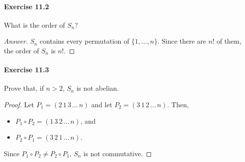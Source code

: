 \paragraph{Exercise 11.2}
What is the order of $S_n$?

\begin{proof}[Answer]
$S_n$ contains every permutation of $\{1,\dots,n\}$. Since there are $n!$ of
them, the order of $S_n$ is $n!$.
\end{proof}

\paragraph{Exercise 11.3}
Prove that, if $n > 2$, $S_n$ is not abelian.

\begin{proof}
Let $P_1 = (2 \, 1 \, 3 \, \dots \, n)$ and let
$P_2 = (3 \, 1 \, 2 \, \dots \, n)$. Then,
\begin{itemize}
    \item $P_1 \circ P_2 = (1 \, 3 \, 2 \, \dots \, n)$, and
    \item $P_2 \circ P_1 = (3 \, 2 \, 1 \, \dots \, n)$.
\end{itemize}
Since $P_1 \circ P_2 \neq P_2 \circ P_1$, $S_n$ is not commutative.
\end{proof}
